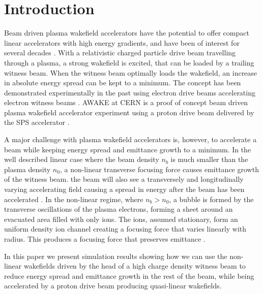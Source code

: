 \documentclass[aps,prstab,reprint,amsmath,amssymb,groupedaddress]{revtex4-1}
\begin{document}
\section{Introduction}\label{S:I}

Beam driven plasma wakefield accelerators have the potential to offer compact linear accelerators with high energy
gradients, and have been of interest for several decades \cite{chen:1985}. With a relativistic charged particle drive
beam travelling through a plasma, a strong wakefield is excited, that can be loaded by a trailing witness beam. When the
witness beam optimally loads the wakefield, an increase in absolute energy spread can be kept to a minimum. The concept
has been demonstrated experimentally in the past using electron drive beams accelerating electron witness beams
\cite{rosenzweig:1988, blumenfeld:2007, kallos:2008}. AWAKE at CERN is a proof of concept beam driven plasma wakefield
accelerator experiment using a proton drive beam delivered by the SPS accelerator \cite{awake_collaboration:2014}.

A major challenge with plasma wakefield accelerators is, however, to accelerate a beam while keeping energy spread and
emittance growth to a minimum. In the well described linear case where the beam density $n_{b}$ is much smaller than the
plasma density $n_{0}$, a non-linear transverse focusing force causes emittance growth of the witness beam. the beam
will also see a transversely and longitudinally varying accelerating field causing a spread in energy after the beam has
been accelerated \cite{katsouleas:1987}. In the non-linear regime, where $n_{b} > n_{0}$, a bubble is formed by the
transverse oscillations of the plasma electrons, forming a sheet around an evacuated area filled with only ions. The
ions, assumed stationary, form an uniform density ion channel creating a focusing force that varies linearly with
radius. This produces a focusing force that preserves emittance \cite{lu:2006-1, lu:2006}.

In this paper we present simulation results showing how we can use the non-linear wakefields driven by the head of a
high charge density witness beam to reduce energy spread and emittance growth in the rest of the beam, while being
accelerated by a proton drive beam producing quasi-linear wakefields.
\end{document}
